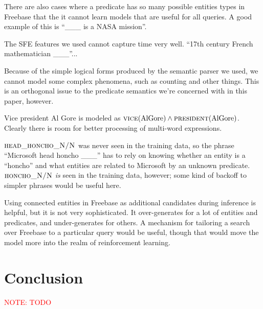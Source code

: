 \documentclass[11pt]{article}
\newcommand{\mattnote}[1]{\textcolor{red}{NOTE: #1}}
\newcommand{\blank}{\_\_\_}
\newcommand{\predicate}[1]{\ensuremath{\textsc{#1}}}
\newcommand{\entity}[1]{\ensuremath{\mathrm{#1}}}
\begin{document}
There are also cases where a predicate has so many possible entities types in
Freebase that the it cannot learn models that are useful for all queries.  A
good example of this is ``\blank{} is a NASA mission''.

The SFE features we used cannot capture time very well.  ``17th century French
mathematician \blank{}''...

Because of the simple logical forms produced by the semantic parser we used, we
cannot model some complex phenomena, such as counting and other things.  This
is an orthogonal issue to the predicate semantics we're concerned with in this
paper, however.

Vice president Al Gore is modeled as $\predicate{vice}(\entity{Al Gore}) \land
\predicate{president}(\entity{Al Gore})$.  Clearly there is room for better
processing of multi-word expressions.

\predicate{head\_honcho\_N/N} was never seen in the training data, so the
phrase ``Microsoft head honcho \blank{}'' has to rely on knowing whether an
entity is a ``honcho'' and what entities are related to Microsoft by an unknown
predicate.  \predicate{honcho\_N/N} \emph{is} seen in the training data,
however; some kind of backoff to simpler phrases would be useful here.

Using connected entities in Freebase as additional candidates during inference
is helpful, but it is not very sophisticated.  It over-generates for a lot of
entities and predicates, and under-generates for others.  A mechanism for
tailoring a search over Freebase to a particular query would be useful, though
that would move the model more into the realm of reinforcement learning.

\section{Conclusion}
\label{sec:conclusion}

\mattnote{TODO}




\end{document}
